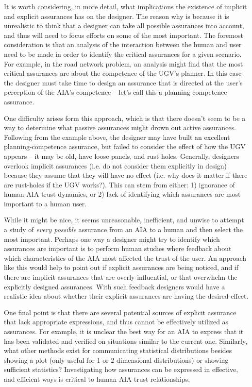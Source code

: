     It is worth considering, in more detail, what implications the existence of implicit and explicit assurances has on the designer. The reason why is because it is unrealistic to think that a designer can take all possible assurances into account, and thus will need to focus efforts on some of the most important. The foremost consideration is that an analysis of the interaction between the human and user need to be made in order to identify the critical assurances for a given scenario. For example, in the road network problem, an analysis might find that the most critical assurances are about the competence of the UGV's planner. In this case the designer must take time to design an assurance that is directed at the user's perception of the AIA's competence -- let's call this a planning-competence assurance.

    One difficulty arises form this approach, which is that there doesn't seem to be a way to determine what passive assurances might drown out active assurances. Following from the example above, the designer may have built an excellent planning-competence assurance, but failed to consider the effect of how the UGV appears -- it may be old, have loose panels, and rust holes. Generally, designers overlook implicit assurances (i.e. do not consider them explicitly in design) because they assume that they will have no effect (i.e. why does it matter if there are rust-holes if the UGV works?). This can stem from either: 1) ignorance of human-AIA trust dynamics, or 2) lack of identifying which assurances are most important to a human user.

    While it might be nice, it seems unreasonable, inefficient, and unwise to attempt a study of \emph{every possible} assurance from an AIA to a human and then select the most important. Perhaps one way a designer might try to identify which assurances are important is to perform human studies where feedback about which characteristics of the AIA most affected the trust of the user. An approach like this would help to point out if explicit assurances are being noticed, and if there are implicit assurances that are overly influential, or that overwhelm the explicitly designed assurances. With such feedback designers would have a realistic idea about whether their explicit assurances are having the desired effect.

    One final point is that there are several potential sources of explicit assurance that lack appropriate expressions, and thus cannot be effectively utilized as assurances. For example, it is unclear the best way for an AIA to express that it has been validated and verified on situations similar to the current one. Similarly, what other methods exist for communicating statistical distributions besides showing a plot (only useful for 1 or 2 dimensional distributions) or showing sufficient statistics? Investigating how assurances can be expressed in effective, and efficient ways is critical to human-AIA trust relationships.

